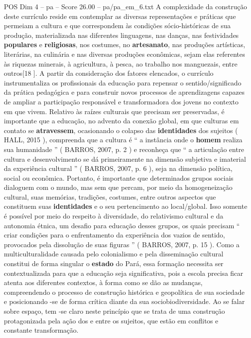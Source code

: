 \begin{textsample}{POS Dim 4 – pa – Score 26.00 – pa/pa\_em\_6.txt}
A complexidade da construção deste currículo reside em contemplar as diversas representações e práticas que permeiam a cultura e que correspondem às condições sócio-históricas de sua produção, materializada nas diferentes linguagens, nas danças, nas festividades \textbf{populares} e \textbf{religiosas}, nos costumes, no \textbf{artesanato}, nas produções artísticas, literárias, na culinária e nas diversas produções econômicas, sejam elas referentes às riquezas minerais, à agricultura, à pesca, ao trabalho nos manguezais, entre outros[18 ].
A partir da consideração dos fatores elencados, o currículo instrumentaliza os profissionais da educação para repensar o sentido/significado da prática pedagógica e para construir novos processos de aprendizagens capazes de ampliar a participação responsável e transformadora dos jovens no contexto em que vivem.
Relativo às raízes culturais que precisam ser preservadas, é importante que a educação, no advento da conexão global, em que culturas em contato se \textbf{atravessem}, ocasionando o colapso das \textbf{identidades} dos sujeitos ( HALL, 2015 ), compreenda que a cultura é “ a instância onde o \textbf{homem} realiza sua humanidade ” ( BARROS, 2007, p. 2 ) e reconheça que “ a articulação entre cultura e desenvolvimento se dá primeiramente na dimensão subjetiva e imaterial da experiência cultural ” ( BARROS, 2007, p. 6 ), seja na dimensão política, social ou econômica.
Portanto, é importante que determinados grupos sociais dialoguem com o mundo, mas sem que percam, por meio da homogeneização cultural, suas memórias, tradições, costumes, entre outros aspectos que constituem suas \textbf{identidades} e o seu pertencimento ao local/global.
Isso somente é possível por meio do respeito à diversidade, do relativismo cultural e da autonomia étnica, um desafio para educação desses grupos, os quais precisam “ criar condições para o enfrentamento da experiência dos vazios de sentido, provocados pela dissolução de suas figuras ” ( BARROS, 2007, p. 15 ).
Como a multiculturalidade causada pelo colonialismo e pela disseminação cultural constitui de forma singular o \textbf{estado} do Pará, essa formação necessita ser contextualizada para que a educação seja significativa, pois a escola precisa ficar atenta aos diferentes contextos, à forma como se dão as mudanças, compreendendo o processo de construção histórica e geopolítica de sua sociedade e posicionando -se de forma crítica diante da sua sociobiodiversidade.
Ao se falar sobre espaço, tem -se claro neste princípio que se trata de uma construção protagonizada pela ação dos e entre os sujeitos, que estão em conflitos e constante transformação.

\end{textsample}
